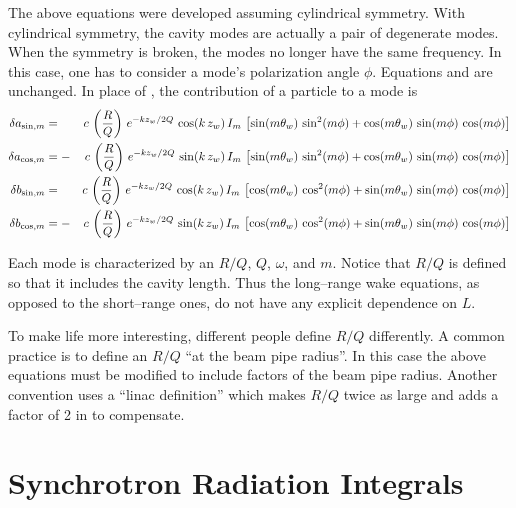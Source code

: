 The above equations were developed assuming cylindrical symmetry. With
cylindrical symmetry, the cavity modes are actually a pair of
degenerate modes. When the symmetry is broken, the modes no longer have the
same frequency. In this case, one has to consider a mode's polarization
angle $\phi$. Equations  and  are unchanged. 
In place of , the contribution of a particle to a mode is
\begin{alignat}{2}
  \delta a_{\sin, m} &=  &c \, \left( \frac{R}{Q} \right) \,
    e^{-k z_w/ 2 Q} \, \cos (k \, z_w) \, I_m \, \left[
    \sin(m \theta_w) \, \sin^2(m \phi) + 
    \cos(m \theta_w) \, \sin(m \phi) \, \cos(m\phi) \right]
    \nonumber \\
  \delta a_{\cos, m} &= -&c \, \left( \frac{R}{Q} \right) \,
    e^{-k z_w/ 2 Q} \, \sin (k \, z_w) \, I_m \, \left[ 
    \sin(m \theta_w) \, \sin^2(m \phi) + 
    \cos(m \theta_w) \, \sin(m \phi) \, \cos(m\phi) \right]
    \\
  \delta b_{\sin, m} &=  &c \, \left( \frac{R}{Q} \right) \,
    e^{-k z_w/ 2 Q} \, \cos (k \, z_w) \, I_m \, \left[
    \cos(m \theta_w) \, \cos^2(m \phi) + 
    \sin(m \theta_w) \, \sin(m \phi) \, \cos(m\phi) \right]
    \nonumber \\
  \delta b_{\cos, m} &= -&c \, \left( \frac{R}{Q} \right) \,
    e^{-k z_w/ 2 Q} \, \sin (k \, z_w) \, I_m \, \left[
    \cos(m \theta_w) \, \cos^2(m \phi) + 
    \sin(m \theta_w) \, \sin(m \phi) \, \cos(m\phi) \right]
    \nonumber
\end{alignat}

Each mode is characterized by an $R/Q$, $Q$, $\omega$, and $m$. Notice
that $R/Q$ is defined so that it includes the cavity length. Thus the
long--range wake equations, as opposed to the short--range ones, do
not have any explicit dependence on $L$. 

To make life more interesting, different people define $R/Q$
differently. A common practice is to define an $R/Q$ ``at the beam
pipe radius''. In this case the above equations must be modified to
include factors of the beam pipe radius. Another convention uses a
``linac definition'' which makes $R/Q$ twice as large and adds a
factor of 2 in  to compensate.

\section{Synchrotron Radiation Integrals}
\label{s:synch.ints}

